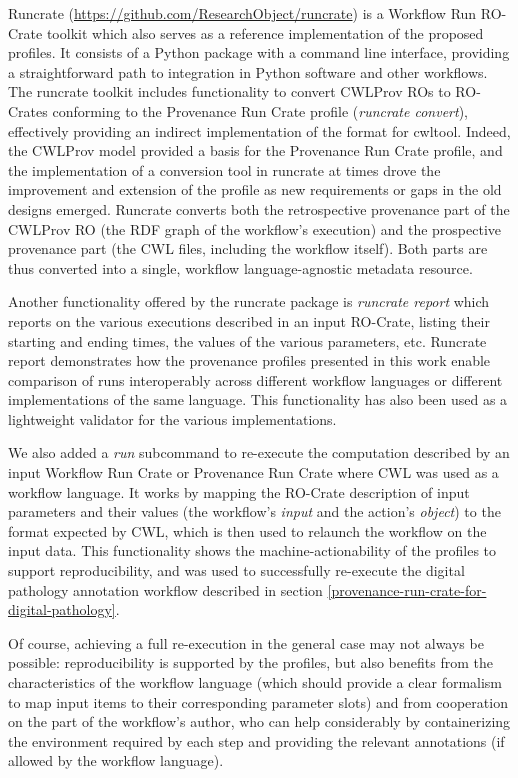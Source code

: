 \documentclass[10pt,letterpaper]{article}
\begin{document}
Runcrate (\url{https://github.com/ResearchObject/runcrate}) \cite{runcrate} is a Workflow Run RO-Crate toolkit which also serves as a reference implementation of the proposed profiles.
It consists of a Python package with a command line interface, providing a straightforward path to integration in Python software and other workflows.
The runcrate toolkit includes functionality to convert CWLProv ROs to RO-Crates conforming to the Provenance Run Crate profile (\emph{runcrate convert}), effectively providing an indirect implementation of the format for cwltool.
Indeed, the CWLProv model provided a basis for the Provenance Run Crate profile, and the implementation of a conversion tool in runcrate at times drove the improvement and extension of the profile as new requirements or gaps in the old designs emerged.
Runcrate converts both the retrospective provenance part of the CWLProv RO (the RDF graph of the workflow's execution) and the prospective provenance part (the CWL files, including the workflow itself).
Both parts are thus converted into a single, workflow language-agnostic metadata resource.

Another functionality offered by the runcrate package is \emph{runcrate report} which reports on the various executions described in an input RO-Crate, listing their starting and ending times, the values of the various parameters, etc.
Runcrate report demonstrates how the provenance profiles presented in this work enable comparison of runs interoperably across different workflow languages or different implementations of the same language.
This functionality has also been used as a lightweight validator for the various implementations.

We also added a \emph{run} subcommand to re-execute the computation described by an input Workflow Run Crate or Provenance Run Crate where CWL was used as a workflow language.
It works by mapping the RO-Crate description of input parameters and their values (the workflow's
\emph{input} and the action's \emph{object}) to the format expected by CWL, which is then used to relaunch the workflow on the input data.
This functionality shows the machine-actionability of the profiles to support reproducibility, and was used to successfully re-execute the digital pathology annotation workflow described in section \ref{provenance-run-crate-for-digital-pathology}.

Of course, achieving a full re-execution in the general case may not always be possible: reproducibility is supported by the profiles, but also benefits from the characteristics of the workflow language (which should provide a clear formalism to map input items to their corresponding parameter slots) and from cooperation on the part of the workflow's author, who can help considerably by containerizing the environment required by each step and providing the relevant annotations (if allowed by the workflow language).
\end{document}
